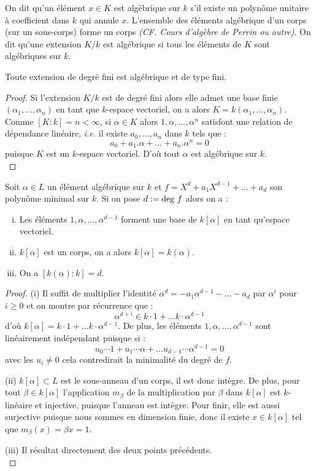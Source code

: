 \documentclass[a4paper]{article} %
\numberwithin{equation}{section}
\begin{document}
On dit qu'un élément $x\in K$ est algèbrique sur $k$ s'il existe un polynôme unitaire à coefficient dans $k$ qui annule $x$. L'ensemble des éléments algébrique d'un corps (sur un sous-corps) forme un corps \textit{(CF. Cours d'algèbre de Perrin ou autre)}. On dit qu'une extension $K/k$ est algébrique si tous les éléments de $K$ sont algébriques sur $k$.

\begin{prop}
Toute extension de degré fini est algébrique et de type fini.
\end{prop}
\begin{proof}
Si l'extension $K/k$ est de degré fini alors elle admet une base finie $(\alpha_1,\dots,\alpha_n)$ en tant que $k$-espace vectoriel, on a alors $K = k(\alpha_1,\dots,\alpha_n)$. Comme $[K:k] = n < \infty$, si $\alpha\in K$ alors $1, \alpha, \dots, \alpha^n$ satisfont une relation de dépendance linéaire, \textit{i.e.} il existe $a_0, \dots, a_n$ dans $k$ tels que :
\[a_0 + a_1.\alpha + \dots + a_n.\alpha^n = 0\]
puisque $K$ est un $k$-espace vectoriel. D'où tout $\alpha$ est algébrique sur $k$.\\
\end{proof}

\begin{prop}
Soit $\alpha\in L$ un élément algébrique sur $k$ et $f = X^d + a_1X^{d-1} + \dots + a_d$ son polynôme minimal sur $k$. Si on pose $d := \textup{deg }f$ alors on a :
\begin{enumerate}[(i)]
\item Les éléments $1, \alpha,\dots,\alpha^{d-1}$ forment une base de $k[\alpha]$ en tant qu'espace vectoriel.
\item $k[\alpha]$ est un corps, on a alors $k[\alpha] = k(\alpha)$.
\item On a $[k(\alpha):k] = d$.
\end{enumerate}
\end{prop}
\begin{proof}
(i) Il suffit de multiplier l'identité $\alpha^d = -a_1\alpha^{d-1} - \dots - a_d$ par $\alpha^i$ pour $i\geq0$ et on montre par récurrence que :
\[\alpha^{d+i} \in k\cdot1 + \dots k\cdot\alpha^{d-1}\]
d'où $k[\alpha] = k\cdot1 + \dots k\cdot\alpha^{d-1}$. De plus, les éléments $1,\alpha,\dots,\alpha^{d-1}$ sont linéairement indépendant puisque si :
\[u_0\cdots1 + u_1\cdots\alpha + \dots u_{d-1}\cdots\alpha^{d-1} = 0\]
avec les $u_i\neq0$ cela contredirait la minimalité du degré de $f$.\par
(ii) $k[\alpha] \subset L$ est le sous-anneau d'un corps, il est donc intègre. De plus, pour tout $\beta\in k[\alpha]$ l'application $m_{\beta}$ de la multiplication par $\beta$ dans $k[\alpha]$ est $k$-linéaire et injective, puisque l'anneau est intègre. Pour finir, elle est aussi surjective puisque nous sommes en dimension finie, donc il existe $x\in k[\alpha]$ tel que $m_{\beta}(x) = \beta x = 1$.\par
(iii) Il résultat directement des deux points précédents.\\
\end{proof}
\end{document}
